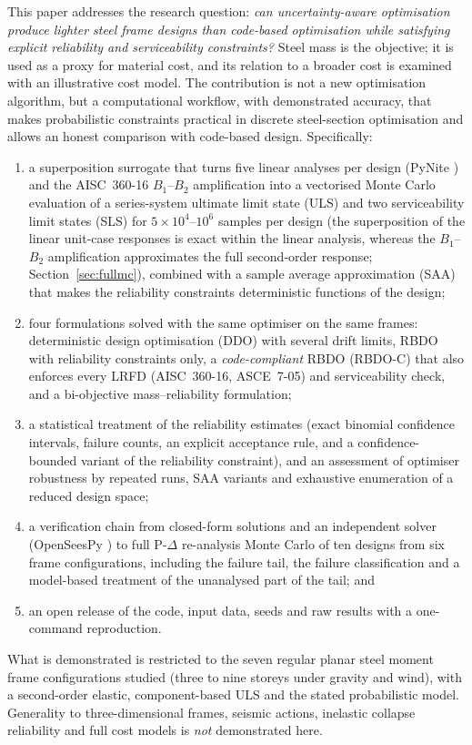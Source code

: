 This paper addresses the research question: \emph{can uncertainty-aware optimisation produce
lighter steel frame designs than code-based optimisation while satisfying explicit reliability and
serviceability constraints?} Steel mass is the objective; it is used as a proxy for material cost,
and its relation to a broader cost is examined with an illustrative cost model. The contribution is
not a new optimisation algorithm, but a computational workflow, with demonstrated accuracy, that
makes probabilistic constraints practical in discrete steel-section optimisation and allows an
honest comparison with code-based design. Specifically:
\begin{enumerate}
\item a superposition surrogate that turns five linear analyses per design (PyNite
\citep{PyNite}) and the AISC~360-16 $B_1$--$B_2$ amplification into a vectorised Monte Carlo
evaluation of a series-system ultimate limit state (ULS) and two serviceability limit states (SLS)
for $5\times10^4$--$10^6$ samples per design (the superposition of the linear unit-case responses
is exact within the linear analysis, whereas the $B_1$--$B_2$ amplification approximates the full
second-order response; Section~\ref{sec:fullmc}), combined with a sample average approximation (SAA)
\citep{Kleywegt2002} that makes the reliability constraints deterministic functions of the design;
\item four formulations solved with the same optimiser on the same frames: deterministic design
optimisation (DDO) with several drift limits, RBDO with reliability constraints only, a
\emph{code-compliant} RBDO (RBDO-C) that also enforces every LRFD (AISC~360-16, ASCE~7-05) and
serviceability check, and a
bi-objective mass--reliability formulation;
\item a statistical treatment of the reliability estimates (exact binomial confidence intervals,
failure counts, an explicit acceptance rule, and a confidence-bounded variant of the reliability
constraint), and an assessment of optimiser robustness by repeated runs, SAA variants and
exhaustive enumeration of a reduced design space;
\item a verification chain from closed-form solutions and an independent solver (OpenSeesPy
\citep{McKenna2010,Zhu2018}) to full P-$\Delta$ re-analysis Monte Carlo of ten designs from six
frame configurations, including the failure tail, the failure classification and a model-based
treatment of the unanalysed part of the tail; and
\item an open release of the code, input data, seeds and raw results with a one-command reproduction.
\end{enumerate}
What is demonstrated is restricted to the seven regular planar steel moment frame configurations
studied (three to nine storeys under gravity and wind), with a second-order elastic, component-based
ULS and the stated probabilistic model. Generality to
three-dimensional frames, seismic actions, inelastic collapse reliability and full cost models is
\emph{not} demonstrated here.


